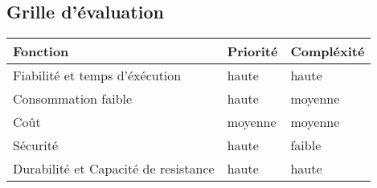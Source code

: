     \subsection{Grille d'évaluation}
        
        \begin{tabular}{l l l}
            \hline
            Fonction & Priorité & Compléxité \\
            \hline
            Fiabilité et temps d'éxécution & haute & haute \\  \hline
				Consommation faible & haute & moyenne \\  \hline
				Coût & moyenne & moyenne \\  \hline
				Sécurité & haute & faible \\  \hline
				Durabilité et Capacité de resistance & haute & haute\\
            \hline
            
        \end{tabular}
